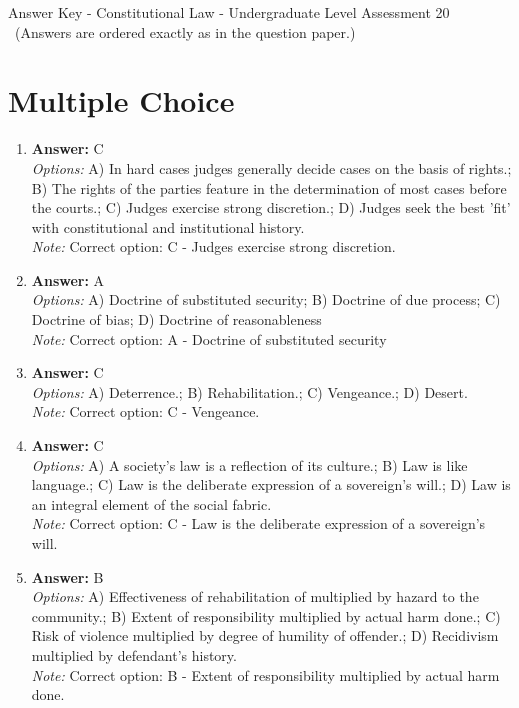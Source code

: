 \documentclass[12pt]{article}
\begin{document}
\begin{center}
Answer Key - Constitutional Law - Undergraduate Level Assessment 20 \
\small (Answers are ordered exactly as in the question paper.)
\end{center}

\section*{Multiple Choice}
\begin{enumerate}[label=\arabic*.]
\item \textbf{Answer:} C
\\ \textit{Options:} A) In hard cases judges generally decide cases on the basis of rights.; B) The rights of the parties feature in the determination of most cases before the courts.; C) Judges exercise strong discretion.; D) Judges seek the best 'fit' with constitutional and institutional history.
\\ \textit{Note:} Correct option: C - Judges exercise strong discretion.
\item \textbf{Answer:} A
\\ \textit{Options:} A) Doctrine of substituted security; B) Doctrine of due process; C) Doctrine of bias; D) Doctrine of reasonableness
\\ \textit{Note:} Correct option: A - Doctrine of substituted security
\item \textbf{Answer:} C
\\ \textit{Options:} A) Deterrence.; B) Rehabilitation.; C) Vengeance.; D) Desert.
\\ \textit{Note:} Correct option: C - Vengeance.
\item \textbf{Answer:} C
\\ \textit{Options:} A) A society's law is a reflection of its culture.; B) Law is like language.; C) Law is the deliberate expression of a sovereign's will.; D) Law is an integral element of the social fabric.
\\ \textit{Note:} Correct option: C - Law is the deliberate expression of a sovereign's will.
\item \textbf{Answer:} B
\\ \textit{Options:} A) Effectiveness of rehabilitation of multiplied by hazard to the community.; B) Extent of responsibility multiplied by actual harm done.; C) Risk of violence multiplied by degree of humility of offender.; D) Recidivism multiplied by defendant's history.
\\ \textit{Note:} Correct option: B - Extent of responsibility multiplied by actual harm done.
\end{enumerate}
\end{document}
